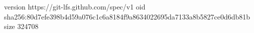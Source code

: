version https://git-lfs.github.com/spec/v1
oid sha256:80d7efe398b4d59a076c1c6a8184f9a8634022695da7133a8b5827ce0d6db81b
size 324708
